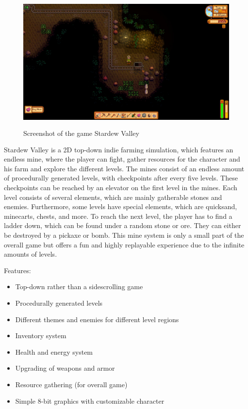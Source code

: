 \documentclass[12p]{article}
\begin{document}
\begin{figure}[ht]
  \center
  \includegraphics[width=1\textwidth]{StateOfTheArtScreenshots/stardew_valley}
  \label{StateOfTheArt_Screenshots_StardewValley}
  \caption{Screenshot of the game Stardew Valley \cite{StardewValleyScreenshot}}
\end{figure}

Stardew Valley is a 2D top-down indie farming simulation, which features an endless mine, where the player can fight, gather resources for the character and his farm and explore the different levels. The mines consist of an endless amount of procedurally generated levels, with checkpoints after every five levels. These checkpoints can be reached by an elevator on the first level in the mines. Each level consists of several elements, which are mainly gatherable stones and enemies. Furthermore, some levels have special elements, which are quicksand, minecarts, chests, and more. To reach the next level, the player has to find a ladder down, which can be found under a random stone or ore. They can either be destroyed by a pickaxe or bomb. This mine system is only a small part of the overall game but offers a fun and highly replayable experience due to the infinite amounts of levels.

Features:

\begin{itemize}
  \item Top-down rather than a sidescrolling game
  \item Procedurally generated levels
  \item Different themes and enemies for different level regions
  \item Inventory system
  \item Health and energy system
  \item Upgrading of weapons and armor
  \item Resource gathering (for overall game)
  \item Simple 8-bit graphics with customizable character
\end{itemize}
\end{document}
